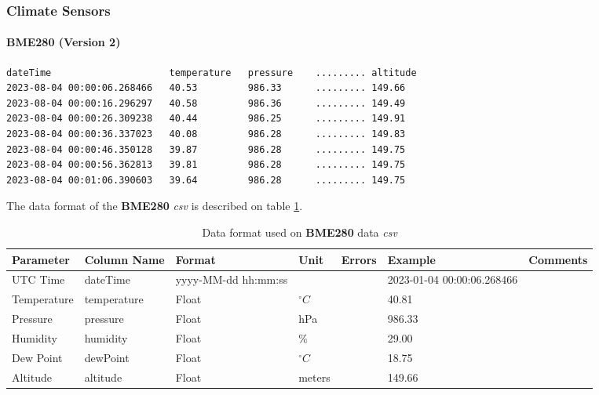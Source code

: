 \documentclass[12pt]{article}
\begin{document}
\subsubsection{Climate Sensors}

\paragraph{BME280  (Version 2)}
    \label{sec:bme280DataFormat}
        {\begin{verbatim}
dateTime                     temperature   pressure    ......... altitude
2023-08-04 00:00:06.268466   40.53         986.33      ......... 149.66
2023-08-04 00:00:16.296297   40.58         986.36      ......... 149.49
2023-08-04 00:00:26.309238   40.44         986.25      ......... 149.91
2023-08-04 00:00:36.337023   40.08         986.28      ......... 149.83
2023-08-04 00:00:46.350128   39.87         986.28      ......... 149.75
2023-08-04 00:00:56.362813   39.81         986.28      ......... 149.75
2023-08-04 00:01:06.390603   39.64         986.28      ......... 149.75
\end{verbatim} }
The data format of the \textbf{BME280} \emph{csv} is described on table \ref{t:dataFormatbme280}.
        \begin{table}[H]
    	\caption{Data format used on \textbf{BME280} data \emph{csv}}
    	 \label{t:dataFormatbme280}
    	\small
    	\begin{tabular}{||p{2cm}| p{2cm}|p{2cm}|p{1.5cm}|p{1.5cm}|p{2cm}|p{2cm}||}
    		\hline
    		\hline
    		Parameter & Column Name & Format & Unit & Errors & Example & Comments \\ 
            \hline
            \hline
    	    UTC Time & dateTime & yyyy-MM-dd hh:mm:ss & & & \tiny 2023-01-04 00:00:06.268466 &  \\
    	    \hline
    		Temperature & temperature  & Float & 
               $ ^{\circ} C$  & &40.81 &  \\
               	\hline
    		Pressure & pressure  & Float & 
               hPa  & & 986.33 &  \\
               	\hline
    		Humidity & humidity  & Float & 
               $ \% $  & & 29.00 & \\
                \hline

            Dew Point & dewPoint  & Float & 
               $ ^{\circ} C$  & & 18.75 & \\
                \hline
    		Altitude & altitude  & Float & 
               meters  & & 149.66 & \\
               	\hline
    		\hline
    	\end{tabular}
    \end{table}
    \clearpage
    
\end{document}
